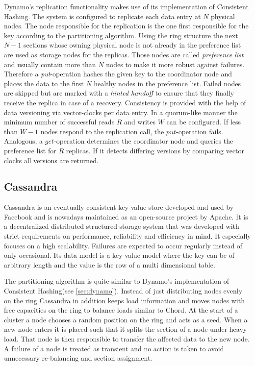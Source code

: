 Dynamo's replication functionality makes use of its implementation of Consistent Hashing.
The system is configured to replicate each data entry at $N$ physical \glspl{node}.
The \gls{node} responsible for the replication is the one first responsible for the key according to the partitioning algorithm.
Using the ring structure the next $N-1$ \glspl{section} whose owning physical node is not already in the preference list are used as storage \glspl{node} for the replicas.
Those \glspl{node} are called \emph{preference list} and usually contain more than $N$ \glspl{node} to make it more robust against failures.
Therefore a \emph{put}-operation hashes the given key to the coordinator \gls{node} and places the data to the first $N$ healthy \glspl{node} in the preference list.
Failed \glspl{node} are skipped but are marked with a \emph{hinted handoff} to ensure that they finally receive the replica in case of a recovery.
Consistency is provided with the help of data versioning via vector-clocks per data entry.
In a quorum-like manner the minimum number of successful reads $R$ and writes $W$ can be configured.
If less than $W-1$ \glspl{node} respond to the replication call, the $put$-operation fails.
Analogous, a $get$-operation determines the coordinator \gls{node} and queries the preference list for $R$ replicas.
If it detects differing versions by comparing vector clocks all versions are returned.


\subsection{Cassandra}
Cassandra\cite{Lakshman2010} is an eventually consistent key-value store developed and used by Facebook and is nowadays maintained as an open-source project by Apache\cite{Cassandra2016}.
It is a decentralized distributed structured storage system that was developed with strict requirements on performance, reliability and efficiency in mind.
It especially focuses on a high scalability.
Failures are expected to occur regularly instead of only occasional.
Its data model is a key-value model where the key can be of arbitrary length and the value is the row of a multi dimensional table.

The partitioning algorithm is quite similar to Dynamo's implementation of Consistent Hashing(see \cref{sec:dynamo}).
Instead of just distributing \glspl{node} evenly on the ring Cassandra in addition keeps load information and moves \glspl{node} with free capacities on the ring to balance loads similar to Chord\cite{Stoica2003}.
At the start of a \gls{cluster} a \gls{node} chooses a random position on the ring and acts as a seed.
When a new node enters it is placed such that it splits the \gls{section} of a \gls{node} under heavy load.
That \gls{node} is then responsible to transfer the affected data to the new \gls{node}.
A failure of a \gls{node} is treated as transient and no action is taken to avoid unnecessary re-balancing and \gls{section} assignment.

